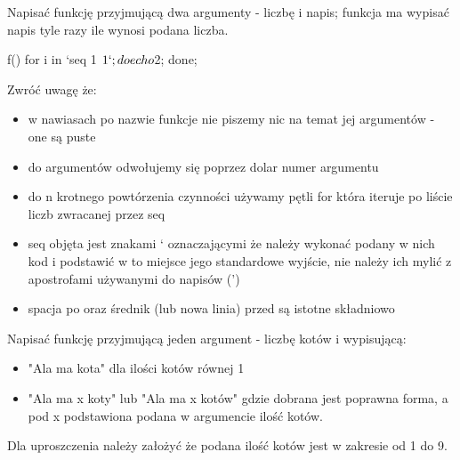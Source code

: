 \dbEntryCheckResults
Napisać funkcję przyjmującą dwa argumenty - liczbę i napis; funkcja ma wypisać napis tyle razy ile wynosi podana liczba.
\fi
{}\dbEntryCheckResults
\begin{CodeFrame*}[bash]{}
f() { for i in `seq 1 $1`; do echo $2; done; }
\end{CodeFrame*}

\noindent Zwróć uwagę że:
\begin{itemize}
\item w nawiasach po nazwie funkcje nie piszemy nic na temat jej argumentów - one są puste
\item do argumentów odwołujemy się poprzez dolar numer argumentu
\item do n krotnego powtórzenia czynności używamy pętli for która iteruje po liście liczb zwracanej przez seq
\item seq objęta jest znakami ` oznaczającymi że należy wykonać podany w nich kod i podstawić w to miejsce jego standardowe wyjście, nie należy ich mylić z apostrofami używanymi do napisów (')
\item spacja po { oraz średnik (lub nowa linia) przed } są istotne składniowo
\end{itemize}
\fi


\dbEntryCheckResults
Napisać funkcję przyjmującą jeden argument - liczbę kotów i wypisującą:
\begin{itemize}
	\item "Ala ma kota" dla ilości kotów równej 1
	\item "Ala ma x koty" lub "Ala ma x kotów" gdzie dobrana jest poprawna forma, a pod x podstawiona podana w argumencie ilość kotów.
\end{itemize}
Dla uproszczenia należy założyć że podana ilość kotów jest w zakresie od 1 do 9.
\fi
{}\dbEntryCheckResults
{}

\fi


